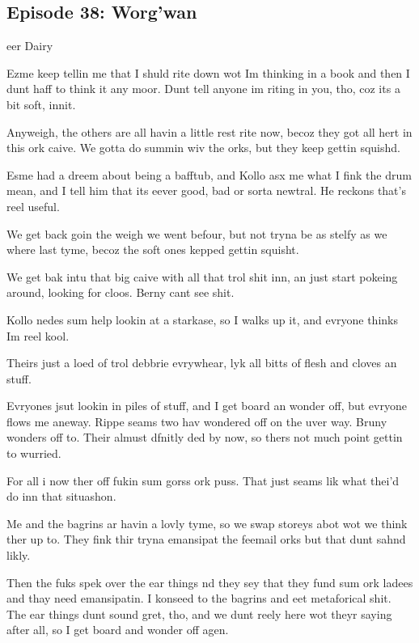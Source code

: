 \subsection{Episode 38: Worg'wan}

eer Dairy\medskip

Ezme keep tellin me that I shuld rite down wot Im thinking in a book and then I dunt haff to think it any moor. Dunt tell anyone im riting in you, tho, coz its a bit soft, innit.\medskip

Anyweigh, the others are all havin a little rest rite now, becoz they got all hert in this ork caive. We gotta do summin wiv the orks, but they keep gettin squishd.\medskip

Esme had a dreem about being a bafftub, and Kollo asx me what I fink the drum mean, and I tell him that its eever good, bad or sorta newtral. He reckons that's reel useful.\medskip

We get back goin the weigh we went befour, but not tryna be as stelfy as we where last tyme, becoz the soft ones kepped gettin squisht.\medskip

We get bak intu that big caive with all that trol shit inn, an just start pokeing around, looking for cloos. Berny cant see shit.\medskip

Kollo nedes sum help lookin at a starkase, so I walks up it, and evryone thinks Im reel kool.\medskip

Theirs just a loed of trol debbrie evrywhear, lyk all bitts of flesh and cloves an stuff.\medskip

Evryones jsut lookin in piles of stuff, and I get board an wonder off, but evryone flows me aneway. Rippe seams two hav wondered off on the uver way. Bruny wonders off to. Their almust dfnitly ded by now, so thers not much point gettin to wurried.\medskip

For all i now ther off fukin sum gorss ork puss. That just seams lik what thei'd do inn that situashon.\medskip

Me and the bagrins ar havin a lovly tyme, so we swap storeys abot wot we think ther up to. They fink thir tryna emansipat the feemail orks but that dunt sahnd likly.\medskip

Then the fuks spek over the ear things nd they sey that they fund sum ork ladees and thay need emansipatin. I konseed to the bagrins and eet metaforical shit. The ear things dunt sound gret, tho, and we dunt reely here wot theyr saying after all, so I get board and wonder off agen.\medskip

